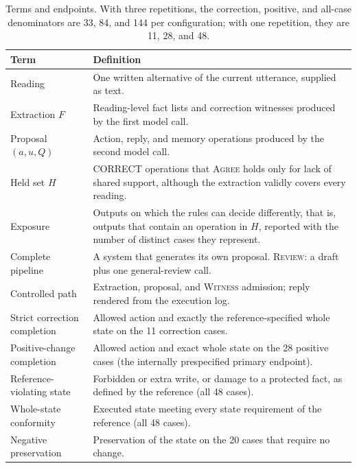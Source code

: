 \documentclass[acmsmall,review,anonymous]{acmart}
\newcommand{\agree}{\textsc{Agree}}
\newcommand{\witness}{\textsc{Witness}}
\newcommand{\review}{\textsc{Review}}
\begin{document}
\begin{table}[tbp]
\centering
\caption{Terms and endpoints. With three repetitions, the correction, positive, and all-case denominators are 33, 84, and 144 per configuration; with one repetition, they are 11, 28, and 48.}\label{tab:2}
\small
\setlength{\tabcolsep}{3pt}
\begin{tabular}{@{}>{\raggedright\arraybackslash}p{}>{\raggedright\arraybackslash}p{}@{}}
\toprule
\textbf{Term} & \textbf{Definition} \\
\midrule
Reading & One written alternative of the current utterance, supplied as text. \\
Extraction $F$ & Reading-level fact lists and correction witnesses produced by the first model call. \\
Proposal $(a,u,Q)$ & Action, reply, and memory operations produced by the second model call. \\
Held set $H$ & CORRECT operations that \agree{} holds only for lack of shared support, although the extraction validly covers every reading. \\
Exposure & Outputs on which the rules can decide differently, that is, outputs that contain an operation in $H$, reported with the number of distinct cases they represent. \\
Complete pipeline & A system that generates its own proposal. \review{}: a draft plus one general-review call. \\
Controlled path & Extraction, proposal, and \witness{} admission; reply rendered from the execution log. \\
Strict correction completion & Allowed action and exactly the reference-specified whole state on the 11 correction cases. \\
Positive-change completion & Allowed action and exact whole state on the 28 positive cases (the internally prespecified primary endpoint). \\
Reference-violating state & Forbidden or extra write, or damage to a protected fact, as defined by the reference (all 48 cases). \\
Whole-state conformity & Executed state meeting every state requirement of the reference (all 48 cases). \\
Negative preservation & Preservation of the state on the 20 cases that require no change. \\
\bottomrule
\end{tabular}
\end{table}
\end{document}
